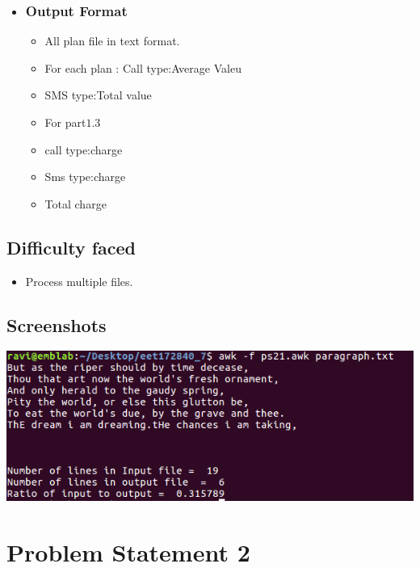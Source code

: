 \documentclass[11pt]{article}
\begin{document}
{{\begin{itemize}
\item \subsubsection{Output Format}
\begin{itemize}
\item All plan file in text format.
\item For each plan : Call type:Average Valeu
\item                 SMS type:Total value  
\item For part$1.3$
\item call type:charge
\item Sms type:charge
\item Total charge
\end{itemize}
\end{itemize}


}

\subsection{Difficulty faced}
{
\begin{itemize}
\item Process multiple files.
\end{itemize}
}



\subsection{Screenshots}
{
\begin{center}
\includegraphics[scale=0.70]{sc1.png}


\end{center}
\newpage
}



\section{Problem Statement 2}
{

}}
\end{document}
